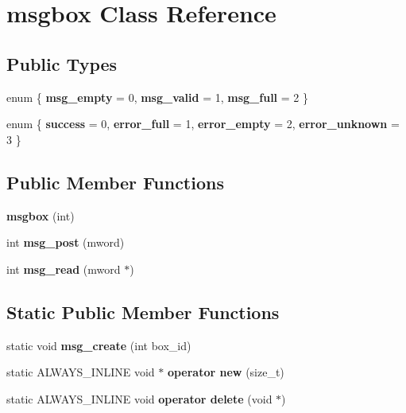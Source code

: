 \section{msgbox Class Reference}
\label{classmsgbox}
\subsection*{Public Types}
\begin{DoxyCompactItemize}
\item 
\mbox{\label{classmsgbox_a5fa90d118c7e8bfd4f549189fd4ff468}} 
enum \{ {\bfseries msg\+\_\+empty} = 0, 
{\bfseries msg\+\_\+valid} = 1, 
{\bfseries msg\+\_\+full} = 2
 \}
\item 
\mbox{\label{classmsgbox_a2d15cde6fdbaaed463196a89cdfbd89a}} 
enum \{ {\bfseries success} = 0, 
{\bfseries error\+\_\+full} = 1, 
{\bfseries error\+\_\+empty} = 2, 
{\bfseries error\+\_\+unknown} = 3
 \}
\end{DoxyCompactItemize}
\subsection*{Public Member Functions}
\begin{DoxyCompactItemize}
\item 
\mbox{\label{classmsgbox_a3c1feb5aec0e93228deabc9a914a5ce9}} 
{\bfseries msgbox} (int)
\item 
\mbox{\label{classmsgbox_a982cd5fb7553947dff7a3dc57ee75b2c}} 
int {\bfseries msg\+\_\+post} (mword)
\item 
\mbox{\label{classmsgbox_ad1243e51db201263b649dd0136ba67f2}} 
int {\bfseries msg\+\_\+read} (mword $\ast$)
\end{DoxyCompactItemize}
\subsection*{Static Public Member Functions}
\begin{DoxyCompactItemize}
\item 
\mbox{\label{classmsgbox_aac0e8499ef77fb2016aa3f042d76cdd4}} 
static void {\bfseries msg\+\_\+create} (int box\+\_\+id)
\item 
\mbox{\label{classmsgbox_a1de995048a3cfa6b720423446cb14432}} 
static A\+L\+W\+A\+Y\+S\+\_\+\+I\+N\+L\+I\+NE void $\ast$ {\bfseries operator new} (size\+\_\+t)
\item 
\mbox{\label{classmsgbox_a7769ac8b0986a85092b040de35218d8f}} 
static A\+L\+W\+A\+Y\+S\+\_\+\+I\+N\+L\+I\+NE void {\bfseries operator delete} (void $\ast$)
\end{DoxyCompactItemize}
